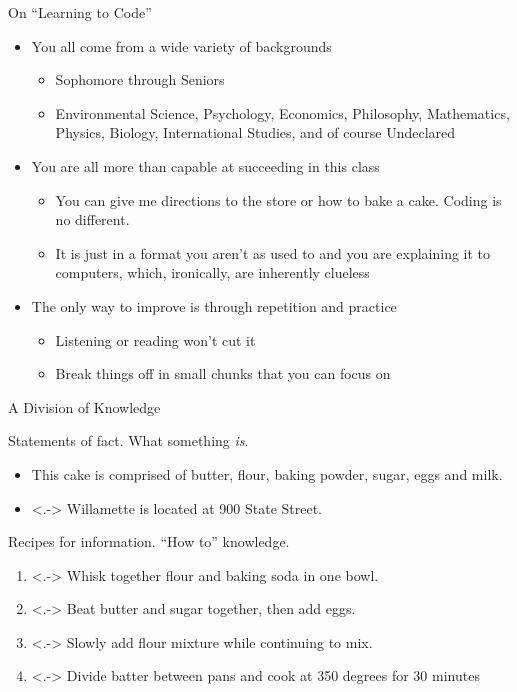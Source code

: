 \documentclass[pdf, aspectratio=169, 12pt]{beamer}
\begin{document}
\begin{frame}{On ``Learning to Code''}
	\begin{itemize}
		\item<1-> You all come from a wide variety of backgrounds
			\begin{itemize}
				\item Sophomore through Seniors
				\item Environmental Science, Psychology, Economics, Philosophy, Mathematics, Physics, Biology, International Studies, and of course Undeclared
			\end{itemize}
		\item<2-> You are all more than capable at succeeding in this class
			\begin{itemize}
				\item You can give me directions to the store or how to bake a cake. Coding is no different.
				\item It is just in a format you aren't as used to and you are explaining it to computers, which, ironically, are inherently clueless
			\end{itemize}
		\item<3-> The only way to improve is through repetition and practice
			\begin{itemize}
				\item Listening or reading won't cut it
				\item Break things off in small chunks that you can focus on
			\end{itemize}
	\end{itemize}
\end{frame}

\begin{frame}{A Division of Knowledge}
	\begin{description}
		\item<+->[Declarative:] Statements of fact. What something \emph{is}.
			\begin{itemize}
				\item<+-> This cake is comprised of butter, flour, baking powder, sugar, eggs and milk.
				\item<.-> Willamette is located at 900 State Street.
			\end{itemize}
		\item<+->[Imperative:] Recipes for information. ``How to'' knowledge.
			\begin{enumerate}
				\item<.-> Whisk together flour and baking soda in one bowl.
				\item<.-> Beat butter and sugar together, then add eggs.
				\item<.-> Slowly add flour mixture while continuing to mix.
				\item<.-> Divide batter between pans and cook at 350 degrees for 30 minutes
			\end{enumerate}
	\end{description}
\end{frame}
\end{document}
